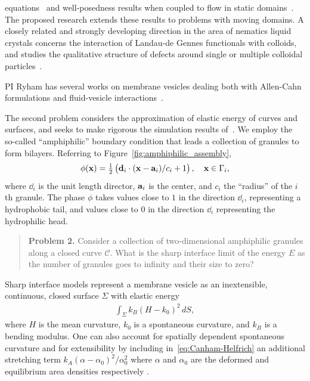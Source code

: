equations~\cite{Christlieb2019CompetitionAC, Gavish2011CurvatureDF,
Dai2019WeakSF, Promislow2017ExistenceBA, Dai2015CompetitiveGE,
Promislow2012CriticalPO, Dai2022GeometricEO, Dai2020MinimizersFT,
Dai2013GeometricEO, Promislow2022UndulatedBI, Gera2017CahnHilliardOS}
and well-posedness
results when coupled to flow in static domains~\cite{Jiang2017TwophaseIF,
Liu2012StrongSF, Giorgini2019WellPosednessOA, Wu2022WellposednessOA,
Gal2010AsymptoticBO, Giorgini2020DiffuseIM, Giorgini2019UniquenessAR}.
The proposed research extends these results to problems with moving
domains. A closely related and strongly developing direction in the area
of nematics liquid crystals concerns the interaction of Landau-de Gennes
functionals with colloids, and studies the qualitative structure of
defects around single or multiple colloidal
particles~\cite{doi:10.1098/rsta.2020.0432, Alama2015MinimizersOT,
Alama2021SaturnRD, PhysRevE.96.042702}.

PI Ryham has several works on
membrane vesicles dealing both with Allen-Cahn formulations and
fluid-vesicle interactions~\cite{QiangDu09, RYHAM20112929, RyCoEi12,
Ryham2017OnTV}.

The second problem considers the approximation of elastic energy of
curves and surfaces, and seeks to make rigorous the simulation results
of~\cite{FuQuRyYo22, Fu2018_SIAM}. We employ the so-called
``amphiphilic'' boundary condition that leads a collection of
granules to form bilayers. Referring to
Figure~\ref{fig:amphiphilic_assembly}, 
\begin{align}
\label{eq:amphiphilic_BC}
  \phi(\xx) = \tfrac{1}{2}\left(\dd_i \cdot 
    (\xx - \aa_i)/c_i + 1\right), \quad \xx \in \Gamma_i,
\end{align}
where $\dd_i$ is the unit length director, $\aa_i$ is the center, and
$c_i$ the ``radius'' of the $i$th granule. The phase $\phi$ takes values
close to $1$ in the direction $\dd_i$, representing a hydrophobic tail,
and values close to $0$ in the direction $\dd_i$ representing the
hydrophilic head.

\begin{quotation}
  \noindent
  \textbf{Problem 2.}
  Consider a collection of two-dimensional amphiphilic granules along a
  closed curve $\mathcal{C}$. What is the sharp interface limit of the
  energy $E$ as the number of granules goes to infinity and their size
  to zero?
\end{quotation}

Sharp interface models represent a membrane vesicle as an
inextensible, continuous, closed surface $\Sigma$ with elastic energy
\begin{align}
  \label{eq:Canham-Helfrich}
  \int_{\Sigma} k_B(H - k_0)^2\, dS,
\end{align}
where $H$ is the mean curvature, $k_0$ is a spontaneous curvature, and
$k_B$ is a bending modulus. One can also account
for spatially dependent spontaneous curvature
\cite{PhysRevE.79.031926,Lowengrub13,mahapatra_saintillan_rangamani_2020}
and for extensibility by
including in~\eqref{eq:Canham-Helfrich} an additional stretching term
$k_A(\alpha - \alpha_0)^2/\alpha_0^2$ where $\alpha$ and $\alpha_0$ are
the deformed and equilibrium area densities respectively
\cite{chabanon2017}.

